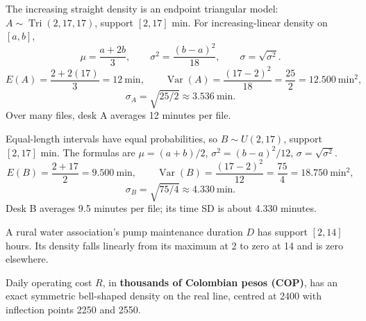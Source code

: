 
The increasing straight density is an endpoint triangular model: $A\sim\operatorname{Tri}(2,17,17)$, support $[2,17]$ min.
For increasing-linear density on $[a,b]$,
\[\mu=\frac{a+2b}3,\qquad\sigma^2=\frac{(b-a)^2}{18},\qquad\sigma=\sqrt{\sigma^2}.\]
\[E(A)=\frac{2+2(17)}3=12\ \text{min},\qquad\operatorname{Var}(A)=\frac{(17-2)^2}{18}=\frac{25}2=12.500\ \text{min}^2,\]
\[\sigma_A=\sqrt{25/2}\approx3.536\ \text{min}.\]
Over many files, desk A averages 12 minutes per file.

Equal-length intervals have equal probabilities, so $B\sim U(2,17)$, support $[2,17]$ min.
The formulas are $\mu=(a+b)/2$, $\sigma^2=(b-a)^2/12$, $\sigma=\sqrt{\sigma^2}$.
\[E(B)=\frac{2+17}2=9.500\ \text{min},\qquad\operatorname{Var}(B)=\frac{(17-2)^2}{12}=\frac{75}4=18.750\ \text{min}^2,\]
\[\sigma_B=\sqrt{75/4}\approx4.330\ \text{min}.\]
Desk B averages 9.5 minutes per file; its time SD is about 4.330 minutes.

A rural water association's pump maintenance duration $D$ has support $[2,14]$ hours. Its density falls linearly from its maximum at 2 to zero at 14 and is zero elsewhere.

Daily operating cost $R$, in \textbf{thousands of Colombian pesos (COP)}, has an exact symmetric bell-shaped density on the real line, centred at 2400 with inflection points 2250 and 2550.


